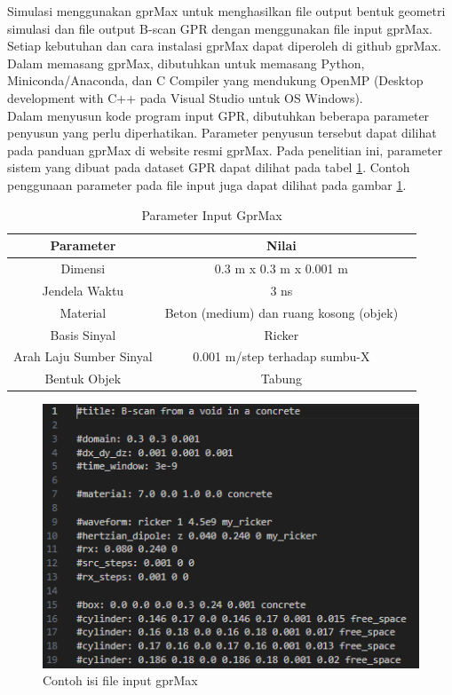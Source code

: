 Simulasi menggunakan gprMax untuk menghasilkan file output bentuk geometri simulasi dan file output B-scan GPR dengan menggunakan file input gprMax. 
Setiap kebutuhan dan cara instalasi gprMax dapat diperoleh di github gprMax. 
Dalam memasang gprMax, dibutuhkan untuk memasang Python, Miniconda/Anaconda, dan C Compiler yang mendukung OpenMP (Desktop development with C++ pada Visual Studio untuk OS Windows). \\

Dalam menyusun kode program input GPR, dibutuhkan beberapa parameter penyusun yang perlu diperhatikan. 
Parameter penyusun tersebut dapat dilihat pada panduan gprMax di website resmi gprMax. 
Pada penelitian ini, parameter sistem yang dibuat pada dataset GPR dapat dilihat pada tabel \ref{tb:inputGPR}. 
Contoh penggunaan parameter pada file input juga dapat dilihat pada gambar \ref{fig:inputgprMax}.

\begin{longtable}{|c|c|c|}
  \caption{Parameter Input GprMax}
  \label{tb:inputGPR}                                   \\
  \hline
  \rowcolor[HTML]{C0C0C0}
  \textbf{Parameter} & \textbf{Nilai} \\
  \hline
  Dimensi                     & 0.3 m x 0.3 m x 0.001 m                   \\
  Jendela Waktu               & 3 ns                                      \\
  Material                    & Beton (medium) dan ruang kosong (objek)   \\
  Basis Sinyal                & Ricker                                    \\
  Arah Laju Sumber Sinyal     & 0.001 m/step terhadap sumbu-X             \\
  Bentuk Objek                & Tabung                                    \\
  \hline
\end{longtable}

\begin{figure}[ht]
  \centering
  \includegraphics[scale=1]{gambar/inputGprMax.png}
  \caption{Contoh isi file input gprMax}
  \label{fig:inputgprMax}
\end{figure}

